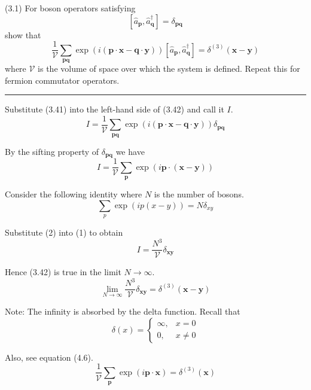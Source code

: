\documentclass[12pt]{article}
\begin{document}
(3.1)
For boson operators satisfying
\begin{equation*}
\left[\hat a_{\mathbf p},\hat a_{\mathbf q}^\dag\right]=\delta_\mathbf{pq}
\tag{3.41}
\end{equation*}
show that
\begin{equation*}
\frac{1}{\mathcal V}\sum_\mathbf{pq}
\exp(i(\mathbf p\cdot\mathbf x-\mathbf q\cdot\mathbf y))
\left[\hat a_{\mathbf p},\hat a_{\mathbf q}^\dag\right]
=\delta^{(3)}(\mathbf x-\mathbf y)
\tag{3.42}
\end{equation*}
where $\mathcal V$ is the volume of space over which the system
is defined.
Repeat this for fermion commutator operators.

\bigskip
\hrule

\bigskip
Substitute (3.41) into the left-hand side of (3.42) and call it $I$.
\begin{equation*}
I=\frac{1}{\mathcal V}\sum_\mathbf{pq}
\exp(i(\mathbf p\cdot\mathbf x-\mathbf q\cdot\mathbf y))
\delta_\mathbf{pq}
\end{equation*}

By the sifting property of $\delta_\mathbf{pq}$ we have
\begin{equation*}
I=\frac{1}{\mathcal V}\sum_\mathbf{p}
\exp(i\mathbf p\cdot(\mathbf x-\mathbf y))
\tag{1}
\end{equation*}

Consider the following identity where $N$ is the number of bosons.
\begin{equation*}
\sum_p\exp(ip(x-y))=N\delta_{xy}
\tag{2}
\end{equation*}

Substitute (2) into (1) to obtain
\begin{equation*}
I=\frac{N^3}{\mathcal V}\delta_\mathbf{xy}
\end{equation*}

Hence (3.42) is true in the limit $N\rightarrow\infty$.
\begin{equation*}
\lim_{N\rightarrow\infty}\frac{N^3}{\mathcal V}
\delta_\mathbf{xy}
=\delta^{(3)}(\mathbf x-\mathbf y)
\end{equation*}

Note: The infinity is absorbed by the delta function.
Recall that
\begin{equation*}
\delta(x)=\begin{cases}
\infty, & x=0
\\
0, & x\ne0
\end{cases}
\end{equation*}

Also, see equation (4.6).
\begin{equation*}
\frac{1}{\mathcal V}\sum_{\mathbf p}\exp(i\mathbf p\cdot\mathbf x)=\delta^{(3)}(\mathbf x)
\tag{4.6}
\end{equation*}
\end{document}
